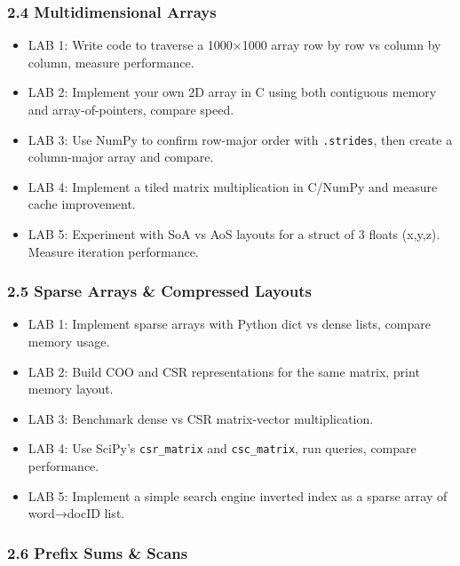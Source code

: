 \documentclass[
  letterpaper,
  DIV=11,
  numbers=noendperiod]{scrreprt}
\providecommand{\tightlist}{%
  \setlength{\itemsep}{0pt}\setlength{\parskip}{0pt}}
\begin{document}
\subsubsection{2.4 Multidimensional
Arrays}\label{multidimensional-arrays-2}

\begin{itemize}
\tightlist
\item
  LAB 1: Write code to traverse a 1000×1000 array row by row vs column
  by column, measure performance.
\item
  LAB 2: Implement your own 2D array in C using both contiguous memory
  and array-of-pointers, compare speed.
\item
  LAB 3: Use NumPy to confirm row-major order with \texttt{.strides},
  then create a column-major array and compare.
\item
  LAB 4: Implement a tiled matrix multiplication in C/NumPy and measure
  cache improvement.
\item
  LAB 5: Experiment with SoA vs AoS layouts for a struct of 3 floats
  (x,y,z). Measure iteration performance.
\end{itemize}

\subsubsection{2.5 Sparse Arrays \& Compressed
Layouts}\label{sparse-arrays-compressed-layouts-1}

\begin{itemize}
\tightlist
\item
  LAB 1: Implement sparse arrays with Python dict vs dense lists,
  compare memory usage.
\item
  LAB 2: Build COO and CSR representations for the same matrix, print
  memory layout.
\item
  LAB 3: Benchmark dense vs CSR matrix-vector multiplication.
\item
  LAB 4: Use SciPy's \texttt{csr\_matrix} and \texttt{csc\_matrix}, run
  queries, compare performance.
\item
  LAB 5: Implement a simple search engine inverted index as a sparse
  array of word→docID list.
\end{itemize}

\subsubsection{2.6 Prefix Sums \& Scans}\label{prefix-sums-scans-2}
\end{document}
